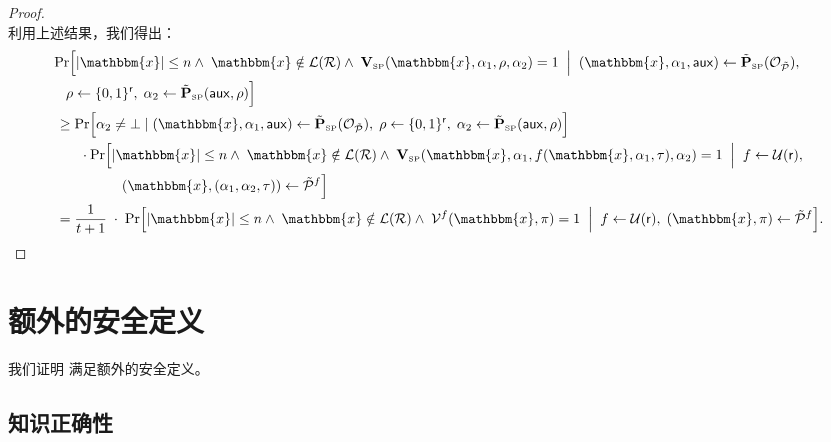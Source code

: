 \documentclass[american,singlepageview]{snargs-book-zh}
\newcommand{\Bits}{\{0,1\}}
\newcommand{\Malicious}[1]{\tilde{#1}}
\newcommand{\AuxiliaryState}{\mathsf{aux}}
\newcommand{\BlackBox}[1]{\mathcal{O}_{#1}}
\newcommand{\SomeSize}[1]{|#1|}
\newcommand{\Relation}{\mathcal{R}}
\newcommand{\Language}{\mathcal{L}}
\newcommand{\GetLanguage}[1]{\Language(#1)}
\newcommand{\Instance}{\mathbbm{x}}
\newcommand{\InstanceSize}{n}
\newcommand{\ProtoProver}{P}
\newcommand{\ProtoVerifier}{V}
\newcommand{\ProtoSalt}{\tau}
\newcommand{\ProtoRandomnessComplexity}{\mathsf{r}}
\newcommand{\SPSubscript}{\scriptscriptstyle\mathrm{SP}}
\newcommand{\SPFormat}[1]{\mathbf{#1}}
\newcommand{\SPVerifier}{\SPFormat{\ProtoVerifier}_{\SPSubscript}}
\newcommand{\SPMaliciousProver}{\Malicious{\SPFormat{\ProtoProver}}_{\SPSubscript}}
\newcommand{\SPCommitment}{\alpha_{1}}
\newcommand{\SPChallenge}{\rho}
\newcommand{\SPResponse}{\alpha_{2}}
\newcommand{\SPRandomnessComplexity}{\ProtoRandomnessComplexity}
\newcommand{\ARGFormat}[1]{\mathcal{#1}}
\newcommand{\ARGProver}{\ARGFormat{\ProtoProver}}
\newcommand{\ARGVerifier}{\ARGFormat{\ProtoVerifier}}
\newcommand{\ARGString}{\pi}
\newcommand{\ROFunction}{f}
\newcommand{\ROQueryBound}{t}
\newcommand{\RODistribution}[1]{\mathcal{U}(#1)}
\newcommand{\RandSaltString}{\ProtoSalt}
\begin{document}
\begin{proof}
\begin{equation}
\end{equation}
利用上述结果，我们得出：
\begin{align*}
& \Pr\Bigl[
  \SomeSize{\Instance} \le \InstanceSize
  \land\;\Instance \notin \GetLanguage{\Relation}
  \land\;\SPVerifier(\Instance,\SPCommitment,\SPChallenge,\SPResponse)=1
\;\Bigm|\;
  (\Instance, \SPCommitment, \AuxiliaryState)\gets\SPMaliciousProver(\BlackBox{\Malicious{\ARGProver}}),\\
&\quad
  \SPChallenge\gets\Bits^{\SPRandomnessComplexity},\;
  \SPResponse\gets\SPMaliciousProver(\AuxiliaryState,\SPChallenge)
\Bigr]\\
&\;\ge
\Pr\Bigl[
  \SPResponse \neq \bot
\mid
  (\Instance, \SPCommitment, \AuxiliaryState)\gets\SPMaliciousProver(\BlackBox{\Malicious{\ARGProver}}),\;
  \SPChallenge\gets\Bits^{\SPRandomnessComplexity},\;
  \SPResponse\gets\SPMaliciousProver(\AuxiliaryState,\SPChallenge)
\Bigr]\\
&\qquad\cdot
\Pr\Bigl[
  \SomeSize{\Instance} \le \InstanceSize
  \land\;\Instance \notin \GetLanguage{\Relation}
  \land\;\SPVerifier(\Instance,\SPCommitment,\ROFunction(\Instance,\SPCommitment,\RandSaltString),\SPResponse)=1
\;\Bigm|\;
  \ROFunction \gets \RODistribution{\SPRandomnessComplexity},\\
&\qquad\qquad\quad
  (\Instance,(\SPCommitment,\SPResponse,\RandSaltString))\gets\Malicious{\ARGProver}^{\ROFunction}
\Bigr]\\
&\;=
\frac{1}{\ROQueryBound+1}\;\cdot\;
\Pr\Bigl[
  \SomeSize{\Instance} \le \InstanceSize
  \land\;\Instance \notin \GetLanguage{\Relation}
  \land\;\ARGVerifier^{\ROFunction}(\Instance,\ARGString)=1
\;\Bigm|\;
  \ROFunction \gets \RODistribution{\SPRandomnessComplexity},\;
  (\Instance,\ARGString)\gets\Malicious{\ARGProver}^{\ROFunction}
\Bigr].
\end{align*}
\end{proof}

\chapter{额外的安全定义}
\label{chapter:fs-for-sp-additional}

我们证明  满足额外的安全定义。

\section{知识正确性}
\label{section:fs-sigma-protocol-adaptive-knowledge-soundness}
\end{document}
